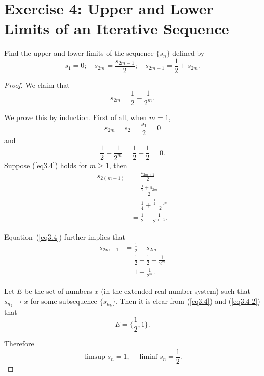 \documentclass{amsbook}
\theoremstyle{definition}
\theoremstyle{remark}
\numberwithin{section}{chapter}
\numberwithin{equation}{chapter}
\begin{document}
\section{Exercise 4: Upper and Lower Limits of an Iterative Sequence}
Find the upper and lower limits of the sequence $\{s_n\}$ defined by\[
s_1=0;\quad s_{2m}=\frac{s_{2m-1}}{2};\quad s_{2m+1}=\frac{1}{2}+s_{2m}.
\]
\begin{proof}
We claim that
\begin{equation}\label{eq3.4}
s_{2m}=\frac{1}{2}-\frac{1}{2^m}.
\end{equation}

We prove this by induction. First of all, when $m=1$,\[
s_{2m}=s_2=\frac{s_{1}}{2}=0
\] and \[
\frac{1}{2}-\frac{1}{2^m}=\frac{1}{2}-\frac{1}{2}=0.
\]Suppose (\ref{eq3.4}) holds for $m\geq1$, then\[
\begin{split}
s_{2(m+1)}&=\frac{s_{2m+1}}{2}\\
&=\frac{\frac{1}{2}+s_{2m}}{2}\\
&=\frac{1}{4}+\frac{\frac{1}{2}-\frac{1}{2^m}}{2}\\
&=\frac{1}{2}-\frac{1}{2^{m+1}}.
\end{split}
\]

Equation~(\ref{eq3.4}) further implies that
\begin{equation}\label{eq3.4 2}
\begin{split}
s_{2m+1}&=\frac{1}{2}+s_{2m}\\
&=\frac{1}{2}+\frac{1}{2}-\frac{1}{2^m}\\
&=1-\frac{1}{2^m}.
\end{split}
\end{equation}

Let $E$ be the set of numbers $x$ (in the extended real number system) such that $s_{n_k}\to x$ for some subsequence $\{s_{n_k}\}$. Then it is clear from (\ref{eq3.4}) and (\ref{eq3.4 2}) that\[
E=\{\frac{1}{2},1\}.
\]

Therefore\[
\limsup s_n=1,\quad\liminf s_n=\frac{1}{2}.
\]
\end{proof}
\end{document}
